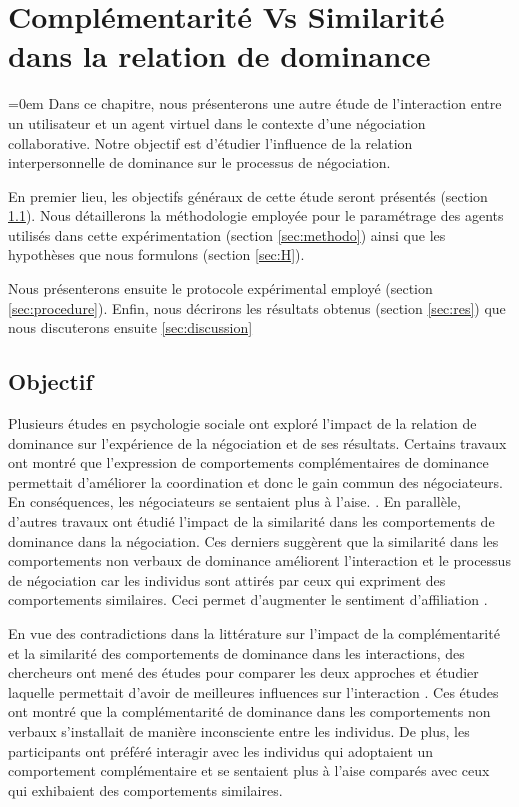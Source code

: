 \chapter[Complémentarité Vs Similarité]{Complémentarité Vs Similarité dans la relation de dominance}
\label{chap:chap6}
	\begingroup
	\parindent=0em
	\localtableofcontents 
	\clearpage
	\endgroup
Dans ce chapitre, nous présenterons une autre étude de l'interaction entre un utilisateur et un agent virtuel dans le contexte d'une négociation collaborative. 
Notre objectif est d'étudier l'influence de la relation interpersonnelle de dominance sur le processus de négociation. 

En premier lieu, les objectifs généraux de cette étude seront présentés (section \ref{sec:obj}). Nous détaillerons la méthodologie employée pour le paramétrage des agents utilisés dans cette expérimentation (section \ref{sec:methodo}) ainsi que les hypothèses que nous formulons (section \ref{sec:H}).

Nous présenterons ensuite le protocole expérimental employé (section \ref{sec:procedure}). Enfin, nous décrirons les résultats obtenus  (section \ref{sec:res})
que nous discuterons ensuite \ref{sec:discussion}
\section{Objectif}
\label{sec:obj}

Plusieurs études en psychologie sociale ont exploré l'impact de la relation de dominance sur l'expérience de la négociation et de ses résultats. Certains travaux ont montré que l'expression de comportements complémentaires de dominance permettait d'améliorer la coordination et donc le gain commun des négociateurs. En conséquences, les négociateurs se sentaient plus à l'aise. \cite{tiedens2003power,wiltermuth2009benefits,olekalns2013dyadic}.
En parallèle, d'autres travaux ont étudié l'impact de la similarité dans les comportements de dominance dans la négociation. Ces derniers suggèrent que la similarité dans les comportements non verbaux de dominance améliorent l'interaction et le processus de négociation car les individus sont attirés par ceux qui expriment des comportements similaires. Ceci permet d'augmenter le sentiment d'affiliation \cite{olekalns2013dyadic}. 

En vue des contradictions dans la littérature sur l'impact de la complémentarité et la similarité des comportements de dominance dans les interactions, des chercheurs ont mené des études pour comparer les deux approches et étudier laquelle permettait d'avoir de meilleures influences sur l'interaction \cite{tiedens2003power,dryer1997opposites}. Ces études ont montré que la complémentarité de dominance dans les comportements non verbaux s'installait de manière inconsciente entre les individus. De plus, les participants ont préféré interagir avec les individus qui adoptaient un comportement complémentaire et se sentaient plus à l'aise comparés avec ceux qui exhibaient des comportements similaires. 


